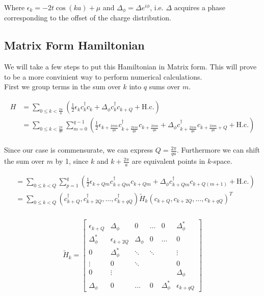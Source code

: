 \documentclass[letterpaper, 10 pt, conference]{ieeeconf}  %
\begin{document}
Where $\epsilon_k = -2t \cos(ka) + \mu $ and $\Delta_\phi = \Delta e^{i\phi}$, i.e. $\Delta$ acquires a phase corresponding to the offset of the charge distribution.






\subsection{Matrix Form Hamiltonian}
We will take a few steps to put this Hamiltonian in Matrix form.
This will prove to be a more convinient way to perform numerical calculations.\\
First we group terms in the sum over $k$ into $q$ sums over $m$.

\begin{align*}
H &= \sum_{0 \leq k < \frac{2\pi}{a}} (\frac{1}{2}\epsilon_k c_k^{\dagger}c_k + \Delta_\phi c_k^{\dagger}c_{k+Q} + \text{H.c.})\\
&=\sum_{0 \leq k < \frac{2\pi}{qa}} \sum_{m=0}^{q-1}  (\frac{1}{2}\epsilon_{k+\frac{2\pi m}{qa}} c_{k+\frac{2\pi m}{qa}}^{\dagger}c_{k+\frac{2\pi m}{qa}} + \Delta_\phi c_{k+\frac{2\pi m}{qa}}^{\dagger}c_{k+\frac{2\pi m}{qa}+Q} + \text{H.c.})\\
\end{align*}

Since our case is commensurate, we can express $Q=\frac{2\pi}{qa}$. Furthermore we can shift the sum over $m$ by 1,
since $k$ and $k+\frac{2\pi}{a}$ are equivalent points in $k$-space.

\begin{align*}
  &=\sum_{0 \leq k < Q} \sum_{p=1}^{q}  (\frac{1}{2}\epsilon_{k+Qm} c_{k+Qm}^{\dagger}c_{k+Qm} + \Delta_\phi c_{k+Qm}^{\dagger}c_{k+Q(m+1)} + \text{H.c.})\\
  &=\sum_{0\leq k < Q} (c_{k+Q}^{\dagger},c_{k+2Q}^{\dagger},\dots,c_{k+qQ}^{\dagger})\tilde{H}_{k} (c_{k+Q},c_{k+2Q},\dots,c_{k+qQ})^{T} \\
\end{align*}

\begin{align}
\tilde{H}_{k}=\begin{bmatrix}
\epsilon_{k+Q}       & \Delta_\phi     & 0      & \hdots     & 0     & \Delta_\phi^*  \\
\Delta_\phi^*    & \epsilon_{k+2Q} & \Delta_\phi & 0 & \hdots     & 0 \\
0               & \Delta_\phi^* & \ddots & \ddots  &  &\vdots \\
\vdots   & 0 & \ddots &  &  &  0  \\
0 &  \vdots    &  &  &  & \Delta_{\phi} \\
\Delta_\phi & 0 &    \hdots          &0   & \Delta_{\phi}^{*}      & \epsilon_{k+qQ}
\end{bmatrix}
\end{align}
\end{document}
